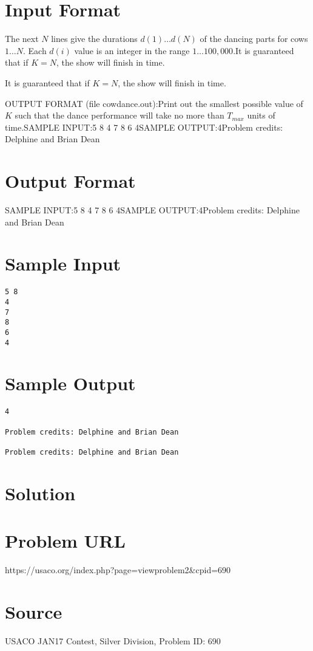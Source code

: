 \documentclass[12pt]{article}
\begin{document}
\section*{Input Format}
The next $N$ lines give the durations $d(1) \ldots d(N)$ of the dancing parts
for cows $1 \ldots N$.  Each $d(i)$ value is an integer in the range
$1 \ldots 100,000$.It is guaranteed that if $K=N$, the show will finish in time.

It is guaranteed that if $K=N$, the show will finish in time.

OUTPUT FORMAT (file cowdance.out):Print out the smallest possible value of $K$ such that the dance performance
will take no more than $T_{max}$ units of time.SAMPLE INPUT:5 8
4
7
8
6
4SAMPLE OUTPUT:4Problem credits: Delphine and Brian Dean

\section*{Output Format}
SAMPLE INPUT:5 8
4
7
8
6
4SAMPLE OUTPUT:4Problem credits: Delphine and Brian Dean

\section*{Sample Input}
\begin{verbatim}
5 8
4
7
8
6
4
\end{verbatim}

\section*{Sample Output}
\begin{verbatim}
4

Problem credits: Delphine and Brian Dean

Problem credits: Delphine and Brian Dean
\end{verbatim}

\section*{Solution}


\section*{Problem URL}
https://usaco.org/index.php?page=viewproblem2&cpid=690

\section*{Source}
USACO JAN17 Contest, Silver Division, Problem ID: 690
\end{document}
